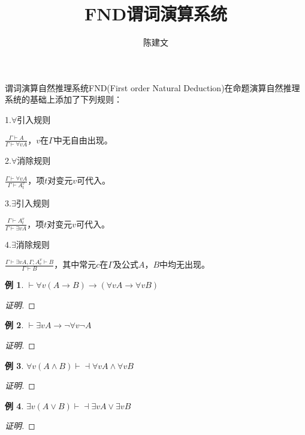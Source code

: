\documentclass{article}
\newtheorem*{Example}{例}
\begin{document}
\begin{CJK*}{UTF8}{gbsn}
  \title{FND谓词演算系统}
  \author{陈建文}
  \maketitle

  谓词演算自然推理系统FND(First order Natural Deduction)在命题演算自然推理系统的基础上添加了下列规则：
  
  1.$\forall$引入规则

  $\frac{\Gamma \vdash A}{\Gamma \vdash \forall v A}$，$v$在$\Gamma$中无自由出现。

  2.$\forall$消除规则

  $\frac{\Gamma \vdash \forall v A}{\Gamma \vdash A_t^v}$，项$t$对变元$v$可代入。

  3.$\exists$引入规则

  $\frac{\Gamma \vdash A_t^v}{\Gamma \vdash \exists v A}$，项$t$对变元$v$可代入。

  4.$\exists$消除规则

  $\frac{\Gamma \vdash \exists vA, \Gamma;A_c^v\vdash B}{\Gamma \vdash B}$，其中常元$c$在$\Gamma$及公式$A$，$B$中均无出现。


  \begin{Example}
    $\vdash \forall v(A\to B)\to (\forall v A\to \forall v B)$
  \end{Example}
  \begin{proof}[证明]

  \end{proof}

  \begin{Example}
    $\vdash \exists vA\to \lnot \forall v\lnot A$
  \end{Example}
  \begin{proof}[证明]

  \end{proof}
  
  \begin{Example}
    $\forall v(A\land B)\vdash \dashv  \forall v A\land \forall v B$
  \end{Example}
  \begin{proof}[证明]

  \end{proof}

  \begin{Example}
    $\exists v(A\lor B)\vdash \dashv  \exists v A\lor \exists v B$
  \end{Example}
  \begin{proof}[证明]


\end{proof}
\end{CJK*}
\end{document}
